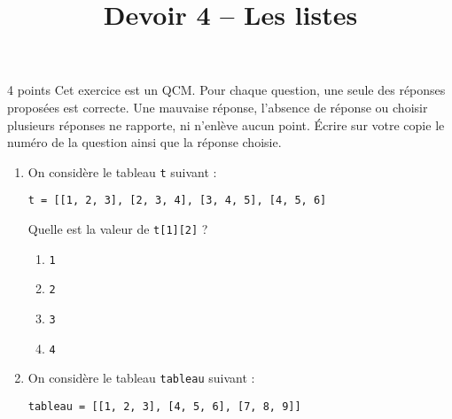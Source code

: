 \documentclass[a4paper,dvipsnames]{article}
\title{Devoir 4 -- Les listes}
\author{}
\date{}
\begin{document}
\renewcommand{\contentsname}{}

\pagestyle{fancy}

\begin{tcolorbox}[colframe=blue!75, colback=blue!45, valign=center, height=1.5cm, top=5mm]
  \maketitle
\end{tcolorbox}


\vspace{1cm}

\thispagestyle{fancy}

\begin{exercice}{4 points}{}
  Cet exercice est un QCM. Pour chaque question, une seule des réponses proposées est correcte. Une mauvaise réponse, l'absence de réponse ou choisir plusieurs réponses ne rapporte, ni n'enlève aucun point.
  Écrire sur votre copie le numéro de la question ainsi que la réponse choisie.
  
  \begin{enumerate}
    \item On considère le tableau \texttt{t} suivant :

      \begin{verbatim}
t = [[1, 2, 3], [2, 3, 4], [3, 4, 5], [4, 5, 6]
      \end{verbatim}

      Quelle est la valeur de \texttt{t[1][2]} ?
      \begin{multicols}{4}
	\begin{enumerate}
	  \item \texttt{1}                    
	  \item \texttt{2}
	  \item \texttt{3}
	  \item \texttt{4}
	\end{enumerate} 
      \end{multicols}
    \item On considère le tableau \texttt{tableau} suivant :

      \begin{verbatim}
tableau = [[1, 2, 3], [4, 5, 6], [7, 8, 9]]
      \end{verbatim}


\end{enumerate}
\end{exercice}
\end{document}
